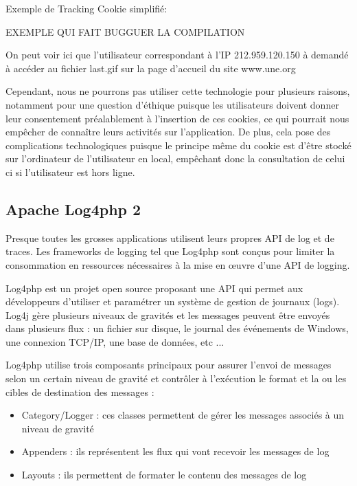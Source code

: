             Exemple de Tracking Cookie simplifié: 

EXEMPLE QUI FAIT BUGGUER LA COMPILATION
			
            
            
            
            On peut voir ici que l'utilisateur correspondant à l'IP 212.959.120.150 à demandé à accéder au fichier last.gif sur la page d'accueil du site www.une.org
            
            Cependant, nous ne pourrons pas utiliser cette technologie pour plusieurs raisons, notamment pour une question d'éthique puisque les utilisateurs doivent donner leur consentement préalablement à l'insertion de ces cookies, ce qui pourrait nous empêcher de connaître leurs activités sur l'application. De plus, cela pose des complications technologiques puisque le principe même du cookie est d'être stocké sur l'ordinateur de l'utilisateur en local, empêchant donc la consultation de celui ci si l'utilisateur est hors ligne.
        
        \subsection{Apache Log4php 2}
        
        
            Presque toutes les grosses applications utilisent leurs propres API de log et de traces. Les frameworks de logging tel que Log4php sont conçus pour limiter la consommation en ressources nécessaires à la mise en œuvre d'une API de logging.
            
            Log4php est un projet open source proposant une API qui permet aux développeurs d'utiliser et paramétrer un système de gestion de journaux (logs). Log4j gère plusieurs niveaux de gravités et les messages peuvent être envoyés dans plusieurs flux : un fichier sur disque, le journal des événements de Windows, une connexion TCP/IP, une base de données, etc ...
        
            Log4php utilise trois composants principaux pour assurer l'envoi de messages selon un certain niveau de gravité et contrôler à l'exécution le format et la ou les cibles de destination des messages :

            \begin{itemize}
                \item Category/Logger : ces classes permettent de gérer les messages associés à un niveau de gravité
                \item Appenders : ils représentent les flux qui vont recevoir les messages de log
                \item Layouts : ils permettent de formater le contenu des messages de log

            \end{itemize}

